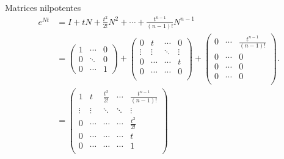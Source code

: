\begin{ejemplo}{Matrices nilpotentes}
\[
\begin{split}
e^{N t}&=I+t N+\frac{t^{2}}{2!} N^{2}+\cdots+\frac{t^{n-1}}{(n-1)!} N^{n-1}\\
        &=\begin{pmatrix}
        1 & \cdots & 0\\
        0 & \ddots & 0 \\
        0&\cdots  & 1
        \end{pmatrix}+
        \begin{pmatrix}
        0 & t & \cdots & 0 \\
        \vdots & \vdots &\ddots & \vdots \\
        0 & \cdots & \cdots & t \\
        0 & \cdots & \cdots & 0 \\
        \end{pmatrix}+
        \begin{pmatrix}
        0 &\cdots &  \frac{t^{n-1}}{(n-1) !} \\
        0 & \cdots &  0 \\
        0 & \cdots &  0 \\
        0 & \cdots &  0 \\
        \end{pmatrix}.\\
        &=
        \begin{pmatrix}
            1 & t & \frac{t^2}{2!} & \cdots & \frac{t^{n-1}}{(n-1) !}  \\
            \vdots & \vdots &\ddots&\ddots & \vdots \\
              0 & \cdots &  \cdots &\cdots & \frac{t^2}{2!} \\
            0 & \cdots &  \cdots &\cdots & t \\
            0 & \cdots  & \cdots& \cdots & 1 \\
        \end{pmatrix}
\end{split}
\]



\end{ejemplo}


